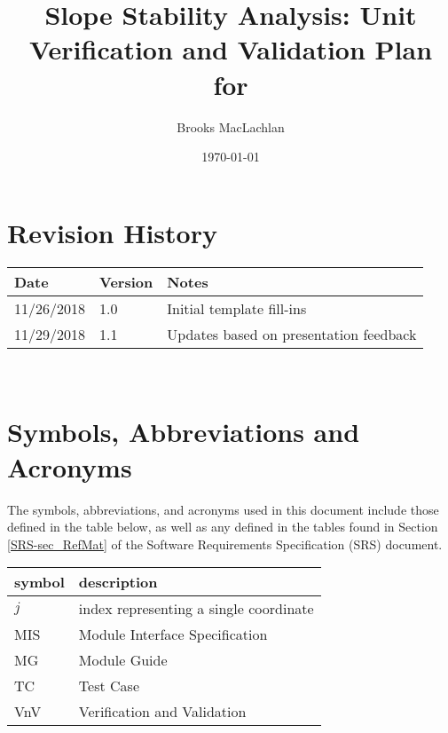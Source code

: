 \documentclass[12pt, titlepage]{article}
\begin{document}
\title{Slope Stability Analysis: Unit Verification and Validation Plan for 
\progname{}} 
\author{Brooks MacLachlan}
\date{\today}
	
\maketitle


\section{Revision History}

\begin{tabularx}{\textwidth}{p{3cm}p{2cm}X}
\toprule {\bf Date} & {\bf Version} & {\bf Notes}\\
\midrule
11/26/2018 & 1.0 & Initial template fill-ins\\
11/29/2018 & 1.1 & Updates based on presentation feedback\\
\bottomrule
\end{tabularx}

~\newpage

\tableofcontents

\listoftables


\listoffigures


\newpage

\section{Symbols, Abbreviations and Acronyms}

The symbols, abbreviations, and acronyms used in this document include those 
defined in the table below, as well as any defined in the tables found in 
Section \ref{SRS-sec_RefMat} of the Software Requirements Specification (SRS) 
document.
\newline

\renewcommand{\arraystretch}{1.2}
\begin{tabular}{l l} 
	\toprule		
	\textbf{symbol} & \textbf{description}\\
	\midrule 
	$j$ & index representing a single coordinate\\
	MIS & Module Interface Specification\\
	MG & Module Guide\\
	TC & Test Case\\
	VnV & Verification and Validation\\
	\bottomrule
\end{tabular}\\
\end{document}
